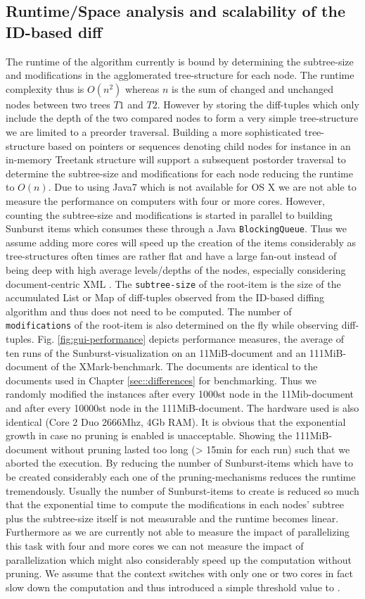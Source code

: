 \subsection{Runtime/Space analysis and scalability of the ID-based diff}
The runtime of the algorithm currently is bound by determining the subtree-size and modifications in the agglomerated tree-structure for each node. The runtime complexity thus is $O(n^2)$ whereas $n$ is the sum of changed and unchanged nodes between two trees $T1$ and $T2$. However by storing the diff-tuples which only include the depth of the two compared nodes to form a very simple tree-structure we are limited to a preorder traversal. Building a more sophisticated tree-structure based on pointers or sequences denoting child nodes for instance in an in-memory Treetank structure will support a subsequent postorder traversal to determine the subtree-size and modifications for each node reducing the runtime to $O(n)$. Due to using Java7 which is not available for OS X we are not able to measure the performance on computers with four or more cores. However, counting the subtree-size and modifications is started in parallel to building Sunburst items which consumes these through a Java \texttt{BlockingQueue}. Thus we assume adding more cores will speed up the creation of the items considerably as tree-structures often times are rather flat and have a large fan-out instead of being deep with high average levels/depths of the nodes, especially considering document-centric XML \cite{ronnau2009efficient}. The \texttt{subtree-size} of the root-item is the size of the accumulated List or Map of diff-tuples observed from the ID-based diffing algorithm and thus does not need to be computed. The number of \texttt{modifications} of the root-item is also determined on the fly while observing diff-tuples. Fig. \ref{fig:gui-performance} depicts performance measures, the average of ten runs of the Sunburst-visualization on an 11MiB-document and an 111MiB-document of the XMark-benchmark.  The documents are identical to the documents used in Chapter \ref{sec::differences} for benchmarking. Thus we randomly modified the instances after every 1000st node in the 11Mib-document and after every 10000st node in the 111MiB-document. The hardware used is also identical (Core 2 Duo 2666Mhz, 4Gb RAM). It is obvious that the exponential growth in case no pruning is enabled is unacceptable. Showing the 111MiB-document without pruning lasted too long (> 15min for each run) such that we aborted the execution. By reducing the number of Sunburst-items which have to be created considerably each one of the pruning-mechanisms reduces the runtime tremendously. Usually the number of Sunburst-items to create is reduced so much that the exponential time to compute the modifications in each nodes' subtree plus the subtree-size itself is not measurable and the runtime becomes linear. Furthermore as we are currently not able to measure the impact of parallelizing this task with four and more cores we can not measure the impact of parallelization which might also considerably speed up the computation without pruning. We assume that the context switches with only one or two cores in fact slow down the computation and thus introduced a simple threshold value to . 

